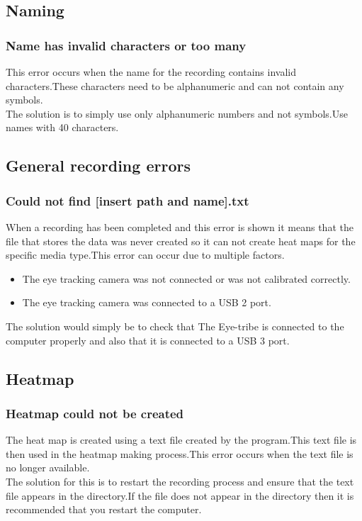 \subsection{Naming}
\subsubsection{Name has invalid characters or too many}
This error occurs when the name for the recording contains invalid characters.These characters need to be alphanumeric and can not contain any symbols.\\
The solution is to simply use only alphanumeric numbers and not symbols.Use names with 40 characters.
\subsection{General recording errors}
\subsubsection{Could not find [insert path and name].txt}
When a recording has been completed and this error is shown it means that the file that stores the data was never created so it can not create heat maps for the specific media type.This error can occur due to multiple factors.\\
\begin{itemize}
\item The eye tracking camera was not connected or was not calibrated correctly.
\item The eye tracking camera was connected to a USB 2 port.
\end{itemize}
The solution would simply be to check that The Eye-tribe is connected to the computer properly and also that it is connected to a USB 3 port.
\subsection{Heatmap}
\subsubsection{Heatmap could not be created}
The heat map is created using a text file created by the program.This text file is then used in the heatmap making process.This error occurs when the text file is no longer available.\\

The solution for this is to restart the recording process and ensure that the text file appears in the directory.If the file does not appear in the directory then it is recommended that you restart the computer.
